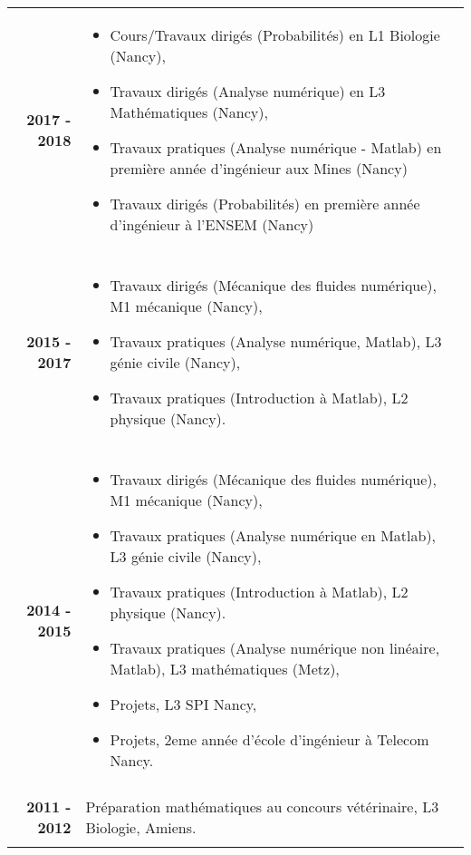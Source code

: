 \documentclass[10pt,a4paper]{report}
\begin{document}
\vspace{0.6cm}
\noindent
\begin{center}
\begin{tabular}{r p{12cm}}
\textbf{2017 - 2018} & \begin{itemize}
\item Cours/Travaux dirigés (Probabilités) en L1 Biologie (Nancy),
\item Travaux dirigés (Analyse numérique) en L3 Mathématiques (Nancy),
\item Travaux pratiques (Analyse numérique - Matlab) en première année d'ingénieur aux Mines (Nancy)
\item Travaux dirigés (Probabilités) en première année d'ingénieur à l'ENSEM (Nancy)
\end{itemize}\\

& \\

\textbf{2015 - 2017} & \begin{itemize}
\item Travaux dirigés (Mécanique des fluides numérique), M1 mécanique (Nancy),
\item Travaux pratiques (Analyse numérique, Matlab), L3 génie civile (Nancy),
\item Travaux pratiques (Introduction à Matlab), L2 physique (Nancy).
\end{itemize}\\

& \\

\textbf{2014 - 2015} & \begin{itemize}
\item Travaux dirigés (Mécanique des fluides numérique), M1 mécanique (Nancy),
\item Travaux pratiques (Analyse numérique en Matlab), L3 génie civile (Nancy),
\item Travaux pratiques (Introduction à Matlab), L2 physique (Nancy).
\item Travaux pratiques (Analyse numérique non linéaire, Matlab), L3 mathématiques (Metz),
\item Projets, L3 SPI Nancy,
\item Projets, 2eme année d'école d'ingénieur à Telecom Nancy.
\end{itemize}\\

& \\

\textbf{2011 - 2012} & Préparation mathématiques au concours vétérinaire, L3 Biologie, Amiens.\\

& \\
\end{tabular}
\end{center}
\end{document}
